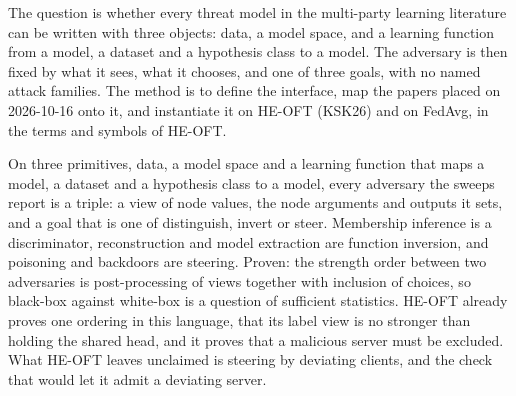 \documentclass{labreport}
\begin{document}
\lrmaketitle

\lrscope
The question is whether every threat model in the multi-party learning
literature can be written with three objects: data, a model space, and a
learning function from a model, a dataset and a hypothesis class to a model. The adversary is then
fixed by what it sees, what it chooses, and one of three goals, with no named
attack families. The method is to define the interface, map the papers placed on
2026-10-16 onto it, and instantiate it on HE-OFT (KSK26) and on FedAvg, in the
terms and symbols of HE-OFT.

\lrresult
On three primitives, data, a model space and a learning function that maps a
model, a dataset and a hypothesis class to a model, every adversary the sweeps
report is a triple: a view of node values, the node arguments and outputs it
sets, and a goal that is one of distinguish, invert or steer. Membership inference is a
discriminator, reconstruction and model extraction are function inversion, and
poisoning and backdoors are steering. Proven: the strength order between two
adversaries is post-processing of views together with inclusion of choices, so
black-box against white-box is a question of sufficient statistics. HE-OFT
already proves one ordering in this language, that its label view is no
stronger than holding the shared head, and it proves that a malicious server
must be excluded. What HE-OFT leaves unclaimed is steering by deviating
clients, and the check that would let it admit a deviating server.


\lrproduced
\begin{lrfacts}
\end{lrfacts}
\end{document}
